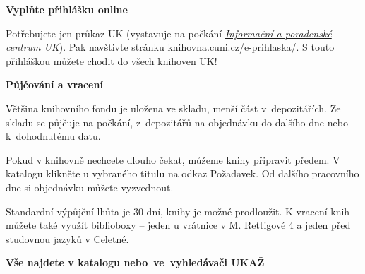

\ifdefined\ikonka\else%
\newcommand\ikonka[1]{\bigskip\bgroup\Large #1\egroup\par}
\renewcommand\section[2][]{%
  \bgroup\large \textbf{#2}\egroup\par%
}
\fi
\ikonka{\faPencil}
\section{Vyplňte přihlášku online}

Potřebujete jen průkaz UK (vystavuje na počkání \href{http://www.cuni.cz/UK-3249.html}{\emph{Informační a poradenské
  centrum UK}}). Pak navštivte stránku \url{knihovna.cuni.cz/e-prihlaska/}.
S touto přihláškou můžete chodit do všech knihoven UK! 

\ikonka{\faBook}
\section{Půjčování a vracení}

Většina knihovního fondu je uložena ve skladu, menší část
v~depozitářích. Ze skladu se půjčuje na počkání, z~depozitářů na
objednávku do dalšího dne nebo k~dohodnutému datu.


Pokud v knihovně nechcete dlouho čekat, můžeme knihy připravit předem. V
katalogu klikněte u vybraného titulu na odkaz Požadavek. Od dalšího pracovního
dne si objednávku můžete vyzvednout.  

Standardní výpůjční lhůta je 30 dní, knihy je možné prodloužit. K vracení knih
můžete také využít biblioboxy – jeden u vrátnice v M. Rettigové 4 a jeden před
studovnou jazyků v Celetné.   


\ikonka{\faSearch}
\section{Vše najdete v katalogu nebo~ve~vyhledávači UKAŽ}

